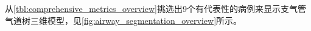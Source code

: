 从\autoref{tbl:comprehensive_metrics_overview}挑选出9个有代表性的病例来显示支气管气道树三维模型，见\autoref{fig:airway_segmentation_overview}所示。
